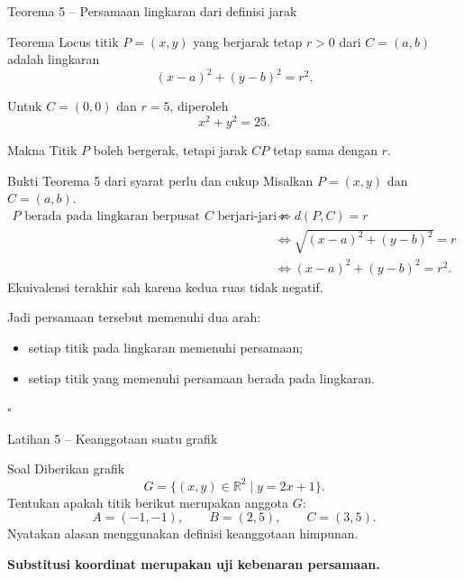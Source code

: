 \documentclass[aspectratio=169,11pt]{beamer}
\begin{document}
\begin{frame}{Teorema 5 -- Persamaan lingkaran dari definisi jarak}
    \begin{block}{Teorema}
        Locus titik $P=(x,y)$ yang berjarak tetap $r>0$ dari
        $C=(a,b)$ adalah lingkaran
        \[
            \boxed{(x-a)^2+(y-b)^2=r^2}.
        \]
    \end{block}

    Untuk $C=(0,0)$ dan $r=5$, diperoleh
    \[
        x^2+y^2=25.
    \]
    \begin{alertblock}{Makna}
        Titik $P$ boleh bergerak, tetapi jarak $CP$ tetap sama dengan $r$.
    \end{alertblock}
    
\end{frame}

\begin{frame}{Bukti Teorema 5 dari syarat perlu dan cukup}
    Misalkan $P=(x,y)$ dan $C=(a,b)$.
    \begin{align*}
        P\text{ berada pada lingkaran berpusat }C\text{ berjari-jari }r
        &\Longleftrightarrow d(P,C)=r\\
        &\Longleftrightarrow
        \sqrt{(x-a)^2+(y-b)^2}=r\\
        &\Longleftrightarrow
        (x-a)^2+(y-b)^2=r^2.
    \end{align*}
    Ekuivalensi terakhir sah karena kedua ruas tidak negatif.

    Jadi persamaan tersebut memenuhi dua arah:
    \begin{itemize}
        \item setiap titik pada lingkaran memenuhi persamaan;
        \item setiap titik yang memenuhi persamaan berada pada lingkaran.
    \end{itemize}
    \hfill$\square$
\end{frame}

\begin{frame}{Latihan 5 -- Keanggotaan suatu grafik}
    \begin{block}{Soal}
        Diberikan grafik
        \[
            G=\{(x,y)\in\mathbb R^2\mid y=2x+1\}.
        \]
        Tentukan apakah titik berikut merupakan anggota $G$:
        \[
            A=(-1,-1),\qquad B=(2,5),\qquad C=(3,5).
        \]
        Nyatakan alasan menggunakan definisi keanggotaan himpunan.
    \end{block}
    \vspace{0.25cm}
    \centering
    \color{AcademicBlue}\bfseries Substitusi koordinat merupakan uji kebenaran persamaan.
\end{frame}
\end{document}
